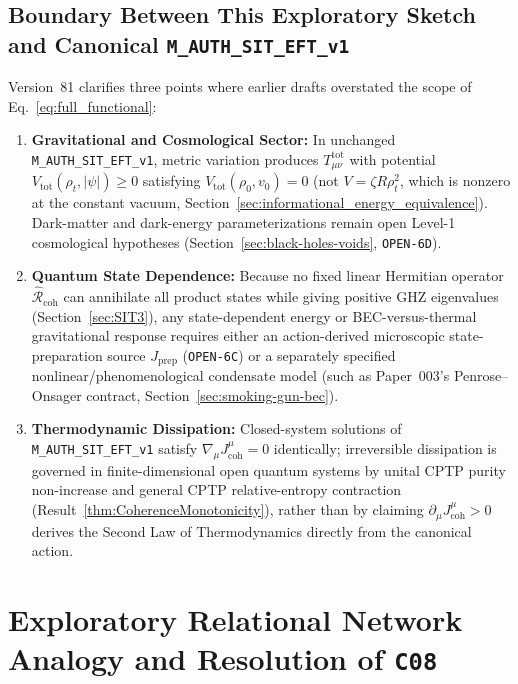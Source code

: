 \subsection{Boundary Between This Exploratory Sketch and Canonical \texttt{M\_AUTH\_SIT\_EFT\_v1}}
Version~81 clarifies three points where earlier drafts overstated the scope of Eq.~\eqref{eq:full_functional}:
\begin{enumerate}[leftmargin=2em]
  \item \textbf{Gravitational and Cosmological Sector:} In unchanged \texttt{M\_AUTH\_SIT\_EFT\_v1}, metric variation produces $T_{\mu\nu}^{\mathrm{tot}}$ with potential $V_{\mathrm{tot}}(\rho_t, |\psi|) \ge 0$ satisfying $V_{\mathrm{tot}}(\rho_0, v_0) = 0$ (not $V = \zeta R\rho_t^2$, which is nonzero at the constant vacuum, Section~\ref{sec:informational_energy_equivalence}). Dark-matter and dark-energy parameterizations remain open Level-1 cosmological hypotheses (Section~\ref{sec:black-holes-voids}, \texttt{OPEN-6D}).
  \item \textbf{Quantum State Dependence:} Because no fixed linear Hermitian operator $\hat{\mathcal{R}}_{\mathrm{coh}}$ can annihilate all product states while giving positive GHZ eigenvalues (Section~\ref{sec:SIT3}), any state-dependent energy or BEC-versus-thermal gravitational response requires either an action-derived microscopic state-preparation source $J_{\mathrm{prep}}$ (\texttt{OPEN-6C}) or a separately specified nonlinear/phenomenological condensate model (such as Paper~003's Penrose--Onsager contract, Section~\ref{sec:smoking-gun-bec}).
  \item \textbf{Thermodynamic Dissipation:} Closed-system solutions of \texttt{M\_AUTH\_SIT\_EFT\_v1} satisfy $\nabla_\mu J^\mu_{\mathrm{coh}} = 0$ identically; irreversible dissipation is governed in finite-dimensional open quantum systems by unital CPTP purity non-increase and general CPTP relative-entropy contraction (Result~\ref{thm:CoherenceMonotonicity}), rather than by claiming $\partial_\mu J^\mu_{\mathrm{coh}} > 0$ derives the Second Law of Thermodynamics directly from the canonical action.
\end{enumerate}



\section{Exploratory Relational Network Analogy and Resolution of \texttt{C08}}
\label{sec:network-formulation}

